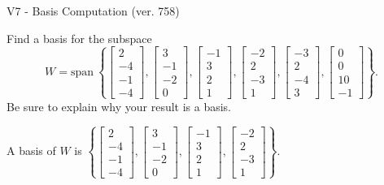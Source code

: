 \begin{exercise}
  \begin{exerciseTitle}V7 - Basis Computation (ver. 758)\end{exerciseTitle}
  \begin{exerciseStatement}
    Find a basis for the subspace 
\[W=\mathrm{span}\ \left\{\left[\begin{array}{r}
2 \\
-4 \\
-1 \\
-4
\end{array}\right] , \left[\begin{array}{r}
3 \\
-1 \\
-2 \\
0
\end{array}\right] , \left[\begin{array}{r}
-1 \\
3 \\
2 \\
1
\end{array}\right] , \left[\begin{array}{r}
-2 \\
2 \\
-3 \\
1
\end{array}\right] , \left[\begin{array}{r}
-3 \\
2 \\
-4 \\
3
\end{array}\right] , \left[\begin{array}{r}
0 \\
0 \\
10 \\
-1
\end{array}\right]\right\}.\]
 Be sure to explain why your result is a basis.


  \end{exerciseStatement}
  \begin{exerciseAnswer}
   A basis of \(W\) is  \(\left\{\left[\begin{array}{r}
2 \\
-4 \\
-1 \\
-4
\end{array}\right] , \left[\begin{array}{r}
3 \\
-1 \\
-2 \\
0
\end{array}\right] , \left[\begin{array}{r}
-1 \\
3 \\
2 \\
1
\end{array}\right] , \left[\begin{array}{r}
-2 \\
2 \\
-3 \\
1
\end{array}\right]\right\}\).
  


  \end{exerciseAnswer}
\end{exercise}